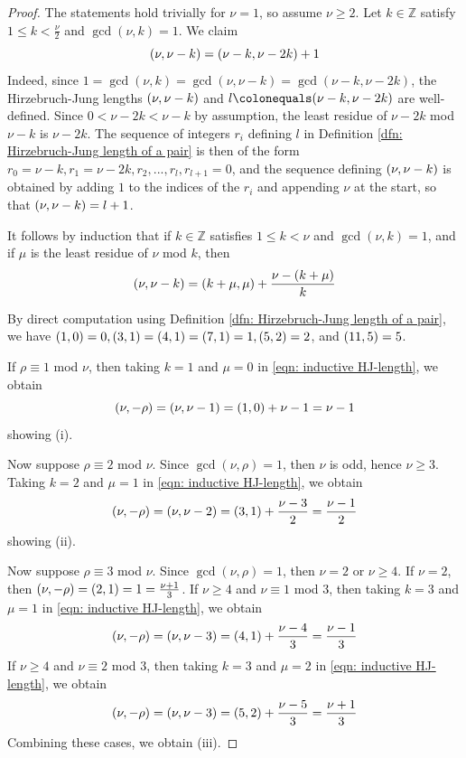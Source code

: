 \documentclass[12pt]{amsart}
\numberwithin{equation}{section}
\theoremstyle{definition}
\newcommand{\Z}{\mathbb Z}
\let\L\relax
\DeclareMathOperator{\L}{L}
\begin{document}
\begin{proof}

    The statements hold trivially for $\nu=1$, so assume $\nu\geq 2$. Let $k\in \Z$ satisfy $1\leq k<\frac{\nu}{2}$ and $\gcd(\nu,k)=1$. We claim 
    \[\L(\nu,\nu-k)=\L(\nu-k,\nu-2k)+1\]
    Indeed, since $1=\gcd(\nu,k)=\gcd(\nu,\nu-k)=\gcd(\nu-k,\nu-2k)$, the Hirzebruch-Jung lengths $\L(\nu,\nu-k)$ and $l\colonequals \L(\nu-k,\nu-2k)$ are well-defined. Since $0<\nu-2k<\nu-k$ by assumption, the least residue of $\nu-2k$ mod $\nu-k$ is $\nu-2k$. The sequence of integers $r_i$ defining $l$ in Definition \ref{dfn: Hirzebruch-Jung length of a pair} is then of the form $r_0=\nu-k,r_1=\nu-2k,r_2,...,r_l,r_{l+1}=0$, and the sequence defining $\L(\nu,\nu-k)$ is obtained by adding $1$ to the indices of the $r_i$ and appending $\nu$ at the start, so that $\L(\nu,\nu-k)=l+1$.

    It follows by induction that if $k\in\Z$ satisfies $1\leq k<\nu$ and $\gcd(\nu,k)=1$, and if $\mu$ is the least residue of $\nu$ mod $k$, then 
    \begin{equation}\label{eqn: inductive HJ-length}
        \L(\nu,\nu-k)=\L(k+\mu,\mu)+\frac{\nu-(k+\mu)}{k}
    \end{equation}

    By direct computation using Definition \ref{dfn: Hirzebruch-Jung length of a pair}, we have $\L(1,0)=0, \L(3,1)=\L(4,1)=\L(7,1)=1, \L(5,2)=2$, and $\L(11,5)=5$. 

    If $\rho\equiv1$ mod $\nu$, then taking $k=1$ and $\mu=0$ in \eqref{eqn: inductive HJ-length}, we obtain \[\L(\nu,-\rho)=\L(\nu,\nu-1)=\L(1,0)+\nu-1=\nu-1\]
    showing (i).

    Now suppose $\rho\equiv 2$ mod $\nu$. Since $\gcd(\nu,\rho)=1$, then $\nu$ is odd, hence $\nu\geq 3$. Taking $k=2$ and $\mu=1$ in \eqref{eqn: inductive HJ-length}, we obtain
    \[\L(\nu,-\rho)=\L(\nu,\nu-2)=\L(3,1)+\frac{\nu-3}{2}=\frac{\nu-1}{2}\]
    showing (ii).

    Now suppose $\rho\equiv3$ mod $\nu$. Since $\gcd(\nu,\rho)=1$, then $\nu=2$ or $\nu\geq 4$. If $\nu=2$, then $\L(\nu,-\rho)=\L(2,1)=1=\frac{\nu+1}{3}$. 
    If $\nu\geq 4$ and $\nu\equiv 1$ mod $3$, then taking $k=3$ and $\mu=1$ in \eqref{eqn: inductive HJ-length}, we obtain
    \[\L(\nu,-\rho)=\L(\nu,\nu-3)=\L(4,1)+\frac{\nu-4}{3}=\frac{\nu-1}{3}\]
    If $\nu\geq 4$ and $\nu\equiv 2$ mod $3$, then taking $k=3$ and $\mu=2$ in \eqref{eqn: inductive HJ-length}, we obtain
    \[\L(\nu,-\rho)=\L(\nu,\nu-3)=\L(5,2)+\frac{\nu-5}{3}=\frac{\nu+1}{3}\]
    Combining these cases, we obtain (iii).
    

\end{proof}
\end{document}
